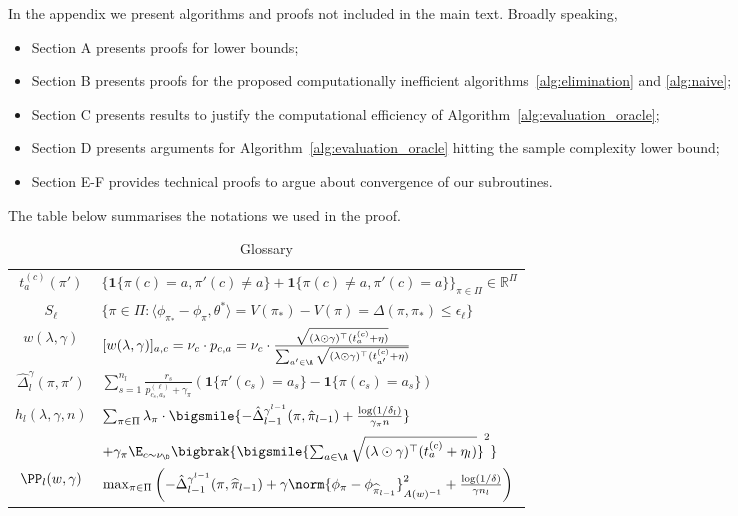 \documentclass{article}
\newcommand{\pill}{\widehat{\pi}_{l-1}}
\newcommand{\1}{\mathbf{1}}
\begin{document}
In the appendix we present algorithms and proofs not included in the main text. Broadly speaking, 
\begin{itemize}
    \item Section A presents proofs for lower bounds; 
    \item Section B presents proofs for the proposed computationally inefficient algorithms~\ref{alg:elimination} and \ref{alg:naive};
    \item Section C presents results to justify the computational efficiency of Algorithm~\ref{alg:evaluation_oracle};
    \item Section D presents arguments for Algorithm~\ref{alg:evaluation_oracle} hitting the sample complexity lower bound;
    \item Section E-F provides technical proofs to argue about convergence of our subroutines.
\end{itemize}
The table below summarises the notations we used in the proof. 
\begin{table}[!htb]
    \centering
    \begin{tabular}{|c|l|}
    \hline
       $t_{a}^{(c)}(\pi')$ & $\{\1\{\pi(c)=a,\pi'(c)\ne a\}+\1\{\pi(c)\ne a,\pi'(c)=a\}\}_{\pi\in \Pi}\in \mathbb{R}^{\Pi}$\\
       $S_\ell$ & $\{\pi\in\Pi: \langle \phi_{\pi_*} - \phi_\pi , \theta^* \rangle=V(\pi_*)-V(\pi)=\Delta(\pi,\pi_*) \leq \epsilon_\ell\}$ \\
       $w(\lambda,\gamma)$ & $[w(\lambda,\gamma)]_{a, c}=\nu_{c} \cdot p_{c,a}=\nu_{c} \cdot \frac{\sqrt{(\lambda\odot\gamma)^{\top} (t_{a}^{(c)}+\eta)}}{\sum_{a'\in \A} \sqrt{(\lambda\odot\gamma)^{\top} (t_{a^{\prime}}^{(c)}+\eta)}}$ \\
       $\hat{\Delta}_{l}^{\gamma}(\pi,\pi')$ & $\sum_{s=1}^{n_l}\frac{r_s}{p^{(\ell)}_{c_s,a_s}+\gamma_\pi}(\1\{\pi'(c_s)=a_s\}-\1\{\pi(c_s)=a_s\})$\\
       $h_l(\lambda, \gamma, n)$ &  $\sum_{\pi\in\Pi}\lambda_\pi\cdot\bigsmile{-\hat{\Delta}_{l-1}^{\gamma^{l-1}}(\pi,\hat{\pi}_{l-1})+\frac{\log(1/\delta_l)}{\gamma_\pi n}}$\\
       &\qquad$+\gamma_\pi\E_{c\sim\nu_\D}\bigbrak{\bigsmile{\sum_{a\in\A}\sqrt{(\lambda\odot\gamma)^{\top} (t_{a}^{(c)}+\eta_l)}}^2}$\\
       $\PP_l(w,\gamma)$&$\max_{\pi\in\Pi} \left(-\hat{\Delta}_{l-1}^{\gamma^{l-1}}(\pi,\pill)+\gamma\norm{\phi_\pi-\phi_{\pill}}_{A(w)^{-1}}^2+\frac{\log(1/\delta)}{\gamma n_l}\right)$\\
    \hline   
    \end{tabular}
    \caption{Glossary}
    \label{tab:glossary}
\end{table}
\end{document}
